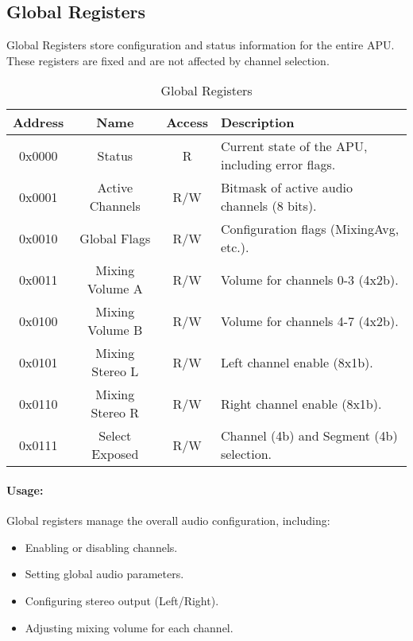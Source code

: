 \subsection{Global Registers}
Global Registers store configuration and status information for the entire APU. These registers are fixed and are not affected by channel selection.

\begin{table}[H]
    \centering
    \begin{tabular}{|c|c|c|l|}
        \hline
        \textbf{Address} & \textbf{Name} & \textbf{Access} & \textbf{Description} \\
        \hline
        0x0000 & Status          & R       & Current state of the APU, including error flags. \\
        0x0001 & Active Channels & R/W     & Bitmask of active audio channels (8 bits). \\
        0x0010 & Global Flags    & R/W     & Configuration flags (MixingAvg, etc.). \\
        0x0011 & Mixing Volume A & R/W     & Volume for channels 0-3 (4x2b). \\
        0x0100 & Mixing Volume B & R/W     & Volume for channels 4-7 (4x2b). \\
        0x0101 & Mixing Stereo L & R/W     & Left channel enable (8x1b). \\
        0x0110 & Mixing Stereo R & R/W     & Right channel enable (8x1b). \\
        0x0111 & Select Exposed  & R/W     & Channel (4b) and Segment (4b) selection. \\
        \hline
    \end{tabular}
    \caption{Global Registers}
\end{table}

\paragraph{Usage:}
Global registers manage the overall audio configuration, including:
\begin{itemize}
    \item Enabling or disabling channels.
    \item Setting global audio parameters.
    \item Configuring stereo output (Left/Right).
    \item Adjusting mixing volume for each channel.
\end{itemize}

